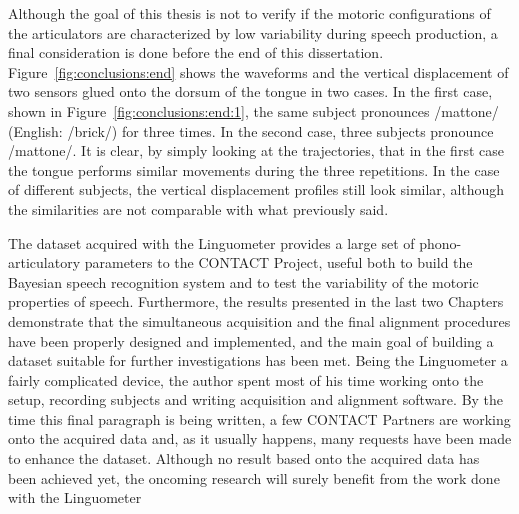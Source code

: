 
Although the goal of this thesis is not to verify if the motoric configurations
of the articulators are characterized by low variability during speech 
production, a final consideration is done before the end of this dissertation.
Figure~\ref{fig:conclusions:end} shows the waveforms and the vertical
displacement of two sensors glued onto the dorsum of the tongue in two cases.
In the first case, shown in Figure~\ref{fig:conclusions:end:1}, the same subject
pronounces /mattone/ (English: /brick/) for three times.
In the second case, three subjects pronounce /mattone/.
It is clear, by simply looking at the trajectories, that in the first case the
tongue performs similar movements during the three repetitions.
In the case of different subjects, the vertical displacement profiles still look
similar, although the similarities are not comparable with what previously 
said.

The dataset acquired with the Linguometer provides a large set of
phono-articulatory parameters to the CONTACT Project, useful both to build the
Bayesian speech recognition system and to test the variability of the motoric
properties of speech.
Furthermore, the results presented in the last two Chapters demonstrate that
the simultaneous acquisition and the final alignment procedures have been
properly designed and implemented, and the main goal of building a dataset 
suitable for further investigations has been met.
Being the Linguometer a fairly complicated device, the author spent most of his
time working onto the setup, recording subjects and writing acquisition and
alignment software.
By the time this final paragraph is being written, 
a few CONTACT Partners are working onto the acquired data and, as it usually 
happens, many requests have been made to enhance the dataset.
Although no result based onto the acquired data has been achieved yet,
the oncoming research will surely benefit from the work done with the
Linguometer
